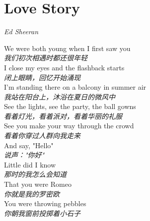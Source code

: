 \section{Love Story}

\thispagestyle{empty}


\begin{center}
\textit{Ed Sheeran}
\end{center}

\vspace{1em}

\begin{spacing}{1.5}
\begin{flushleft}
We were both young when I first saw you\\
{\textit{我们初次相遇时都还很年轻}}\\[0.5em]

I close my eyes and the flashback starts\\
{\textit{闭上眼睛，回忆开始涌现}}\\[0.5em]

I'm standing there on a balcony in summer air\\
\textit{我站在阳台上，沐浴在夏日的微风中}\\[0.5em]

See the lights, see the party, the ball gowns\\
\textit{看着灯光，看着派对，看着华丽的礼服}\\[0.5em]

See you make your way through the crowd\\
\textit{看着你穿过人群向我走来}\\[0.5em]

And say, "Hello"\\
\textit{说声："你好"}\\[0.5em]

Little did I know\\
\textit{那时的我怎么会知道}\\[0.5em]

That you were Romeo\\
\textit{你就是我的罗密欧}\\[0.5em]

You were throwing pebbles\\
\textit{你朝我窗前投掷着小石子}\\[0.5em]


\end{flushleft}
\end{spacing}
